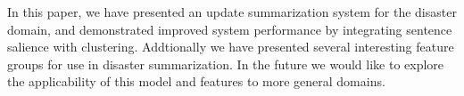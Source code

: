 In this paper, we have presented an update summarization system for the disaster domain,
and demonstrated improved system performance by integrating sentence salience with clustering.
Addtionally we have presented several interesting feature groups for use in disaster summarization.
In the future we would like to explore the applicability of this model and features
to more general domains.
